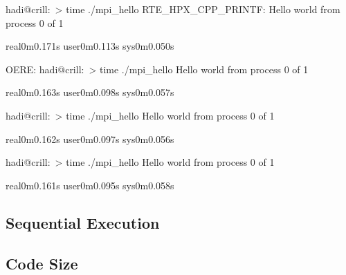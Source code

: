 hadi@crill:~> time ./mpi_hello
RTE_HPX_CPP_PRINTF: Hello world from process 0 of 1

real0m0.171s
user0m0.113s
sys0m0.050s

OERE:
hadi@crill:~> time ./mpi_hello
Hello world from process 0 of 1

real0m0.163s
user0m0.098s
sys0m0.057s

hadi@crill:~> time ./mpi_hello
Hello world from process 0 of 1

real0m0.162s
user0m0.097s
sys0m0.056s

hadi@crill:~> time ./mpi_hello
Hello world from process 0 of 1

real0m0.161s
user0m0.095s
sys0m0.058s




\subsection{Sequential Execution}


\subsection{Code Size}
